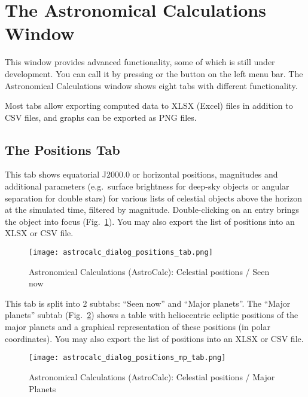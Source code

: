 \section{The Astronomical Calculations Window}
\label{sec:gui:AstroCalc}

This window  provides advanced functionality, some of which is still under development.
You can call it by pressing  or the button  on the left menu bar. 
The Astronomical Calculations window shows eight tabs with different functionality.

Most tabs allow  exporting computed data to XLSX (Excel) files in addition to CSV files, and
graphs can be exported  as PNG files.

\subsection{The Positions Tab}
\label{sec:gui:AstroCalc:Positions}

This tab  shows equatorial J2000.0 or horizontal positions, magnitudes and additional parameters 
(e.g.\ surface brightness for deep-sky objects or angular separation for double stars) for various 
lists of celestial objects above the horizon at the simulated time, filtered by magnitude. 
Double-clicking on an entry brings the object into focus (Fig.~\ref{fig:gui:AstroCalc:Positions}). 
You may also export the list of positions into an XLSX or CSV file.

\begin{figure}[htbp]
	\centering\texttt{[image: astrocalc\_dialog\_positions\_tab.png]}
	\caption{Astronomical Calculations (AstroCalc): Celestial positions / Seen now}
	\label{fig:gui:AstroCalc:Positions}
\end{figure}

This tab  is split into 2 subtabs: ``Seen now'' and ``Major planets''.
The ``Major planets'' subtab (Fig.~\ref{fig:gui:AstroCalc:Positions:MajorPlanets}) shows a table
with heliocentric ecliptic positions of the major planets and a graphical representation of these positions
(in polar coordinates). You may also export the list of positions into an XLSX or CSV file.

\begin{figure}[htbp]
	\centering\texttt{[image: astrocalc\_dialog\_positions\_mp\_tab.png]}
	\caption{Astronomical Calculations (AstroCalc): Celestial positions / Major Planets}
	\label{fig:gui:AstroCalc:Positions:MajorPlanets}
\end{figure}

